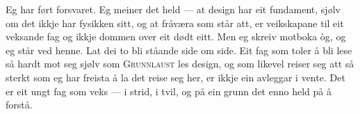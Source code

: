 Eg har ført forsvaret. Eg meiner det held — at design har eit fundament, sjølv om det ikkje har fysikken sitt, og at fråværa som står att, er veikskapane til eit veksande fag og ikkje dommen over eit dødt eitt. Men eg skreiv motboka òg, og eg står ved henne. Lat dei to bli ståande side om side. Eit fag som toler å bli lese så hardt mot seg sjølv som \textsc{Grunnlaust} les design, og som likevel reiser seg att så sterkt som eg har freista å la det reise seg her, er ikkje ein avleggar i vente. Det er eit ungt fag som veks — i strid, i tvil, og på ein grunn det enno held på å forstå.
